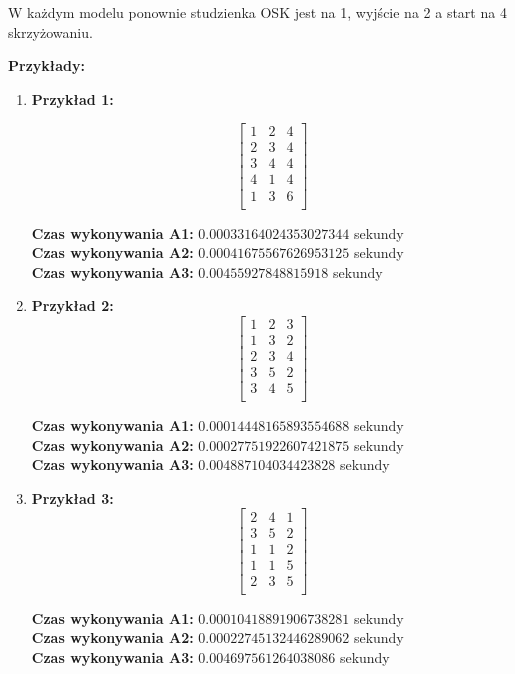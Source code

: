 \documentclass[12pt,a4paper]{article}
\begin{document}
W każdym modelu ponownie studzienka OSK jest na 1, wyjście na 2 a start na 4 skrzyżowaniu.

\textbf{Przykłady:}

\begin{enumerate}
\item \textbf{Przykład 1:}

\[
\begin{bmatrix}
1 & 2 & 4 \\
2 & 3 & 4 \\
3 & 4 & 4 \\
4 & 1 & 4 \\
1 & 3 & 6 \\
\end{bmatrix}
\]

\textbf{Czas wykonywania A1:} $0.00033164024353027344$ sekundy \\
\textbf{Czas wykonywania A2:} $0.00041675567626953125$ sekundy \\
\textbf{Czas wykonywania A3:} $0.00455927848815918$ sekundy

\item \textbf{Przykład 2:}
\[ 
\begin{bmatrix}
1 & 2 & 3 \\
1 & 3 & 2 \\
2 & 3 & 4 \\
3 & 5 & 2 \\
3 & 4 & 5 \\
\end{bmatrix}
\]

\textbf{Czas wykonywania A1:} $0.00014448165893554688$ sekundy  \\
\textbf{Czas wykonywania A2:} $0.00027751922607421875$ sekundy \\
\textbf{Czas wykonywania A3:} $0.004887104034423828$ sekundy

\item \textbf{Przykład 3:}
\[
\begin{bmatrix}
2 & 4 & 1 \\
3 & 5 & 2 \\
1 & 1 & 2 \\
1 & 1 & 5 \\
2 & 3 & 5 \\
\end{bmatrix}
\]

\textbf{Czas wykonywania A1:} $0.00010418891906738281$ sekundy \\
\textbf{Czas wykonywania A2:} $0.00022745132446289062$ sekundy \\
\textbf{Czas wykonywania A3:} $0.004697561264038086$ sekundy
\end{enumerate}
\end{document}
